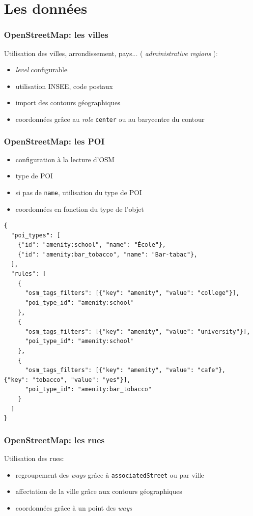 \documentclass[table]{beamer}
\newcommand*{\foreign}[2][english]{%
    \emph{\foreignlanguage{#1}{#2}}%
}
\begin{document}
\section{Les données}

\begin{frame}
  \frametitle{OpenStreetMap: les villes}

  Utilisation des villes, arrondissement, pays... (\foreign{administrative regions}):
  \begin{itemize}
  \item \foreign{level} configurable
  \item utilisation INSEE, code postaux
  \item import des contours géographiques
  \item coordonnées grâce au \foreign{role} \texttt{center} ou au
    barycentre du contour
  \end{itemize}
\end{frame}

\begin{frame}[fragile]
  \frametitle{OpenStreetMap: les POI}

  \begin{itemize}
  \item configuration à la lecture d'OSM
  \item type de POI
  \item si pas de \texttt{name}, utilisation du type de POI
  \item coordonnées en fonction du type de l'objet
  \end{itemize}

  \tiny
\begin{verbatim}
{
  "poi_types": [
    {"id": "amenity:school", "name": "École"},
    {"id": "amenity:bar_tobacco", "name": "Bar-tabac"},
  ],
  "rules": [
    {
      "osm_tags_filters": [{"key": "amenity", "value": "college"}],
      "poi_type_id": "amenity:school"
    },
    {
      "osm_tags_filters": [{"key": "amenity", "value": "university"}],
      "poi_type_id": "amenity:school"
    },
    {
      "osm_tags_filters": [{"key": "amenity", "value": "cafe"}, {"key": "tobacco", "value": "yes"}],
      "poi_type_id": "amenity:bar_tobacco"
    }
  ]
}
\end{verbatim}
\end{frame}

\begin{frame}
  \frametitle{OpenStreetMap: les rues}

  Utilisation des rues:
  \begin{itemize}
  \item regroupement des \foreign{ways} grâce à
    \texttt{associatedStreet} ou par ville
  \item affectation de la ville grâce aux contours géographiques
  \item coordonnées grâce à un point des \foreign{ways}
  \end{itemize}
\end{frame}
\end{document}
